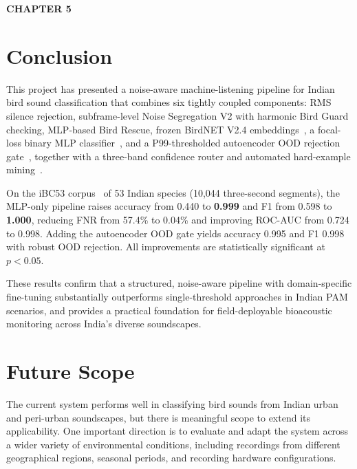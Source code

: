 \documentclass[a4paper,12pt]{article}
\begin{document}
\begin{center}
{\fontsize{18}{20}\bfseries CHAPTER 5}
\end{center}


\vspace{0.5cm}

\setcounter{section}{0}
\renewcommand{\thesection}{5.\arabic{section}}

\section{Conclusion}

\noindent
This project has presented a noise-aware machine-listening pipeline for Indian bird sound
classification that combines six tightly coupled components: RMS silence rejection,
subframe-level Noise Segregation V2 with harmonic Bird Guard checking, MLP-based Bird Rescue,
frozen BirdNET V2.4 embeddings~\cite{BirdNET}, a focal-loss binary MLP classifier~\cite{FocalLoss},
and a P99-thresholded autoencoder OOD rejection gate~\cite{Ntalampiras,Hinton}, together with a
three-band confidence router and automated hard-example mining~\cite{Kath,Rauch}.

\vspace{0.3cm}

\noindent
On the iBC53 corpus~\cite{iBC53} of 53 Indian species (10,044 three-second segments), the
MLP-only pipeline raises accuracy from 0.440 to \textbf{0.999} and F1 from 0.598 to \textbf{1.000},
reducing FNR from 57.4\% to 0.04\% and improving ROC-AUC from 0.724 to 0.998. Adding the
autoencoder OOD gate yields accuracy 0.995 and F1 0.998 with robust OOD rejection. All improvements
are statistically significant at $p < 0.05$.

\vspace{0.3cm}

\noindent
These results confirm that a structured, noise-aware pipeline with domain-specific fine-tuning
substantially outperforms single-threshold approaches in Indian PAM scenarios, and provides a
practical foundation for field-deployable bioacoustic monitoring across India's diverse soundscapes.

\section{Future Scope}

\noindent
The current system performs well in classifying bird sounds from Indian urban and peri-urban
soundscapes, but there is meaningful scope to extend its applicability. One important direction
is to evaluate and adapt the system across a wider variety of environmental conditions, including
recordings from different geographical regions, seasonal periods, and recording hardware configurations.
\end{document}
